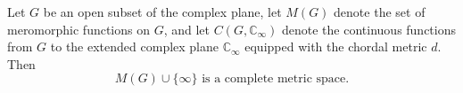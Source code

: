 Let $G$ be an open subset of the complex plane, let $M(G)$ denote the set of meromorphic functions on $G$, and let $C(G, \mathbb{C}_\infty)$ denote the continuous functions from $G$ to the extended complex plane $\mathbb{C}_\infty$ equipped with the chordal metric $d$. Then
$$M(G) \cup \{\infty\} \text{ is a complete metric space.}$$
